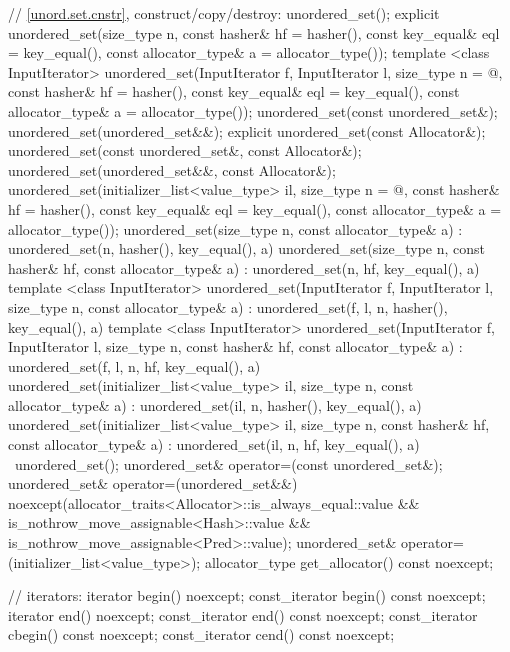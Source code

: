 \begin{codeblock}
{{    // \ref{unord.set.cnstr}, construct/copy/destroy:
    unordered_set();
    explicit unordered_set(size_type n,
                           const hasher& hf = hasher(),
                           const key_equal& eql = key_equal(),
                           const allocator_type& a = allocator_type());
    template <class InputIterator>
      unordered_set(InputIterator f, InputIterator l,
                    size_type n = @\seebelow@,
                    const hasher& hf = hasher(),
                    const key_equal& eql = key_equal(),
                    const allocator_type& a = allocator_type());
    unordered_set(const unordered_set&);
    unordered_set(unordered_set&&);
    explicit unordered_set(const Allocator&);
    unordered_set(const unordered_set&, const Allocator&);
    unordered_set(unordered_set&&, const Allocator&);
    unordered_set(initializer_list<value_type> il,
                  size_type n = @\seebelow@,
                  const hasher& hf = hasher(),
                  const key_equal& eql = key_equal(),
                  const allocator_type& a = allocator_type());
    unordered_set(size_type n, const allocator_type& a)
      : unordered_set(n, hasher(), key_equal(), a) { }
    unordered_set(size_type n, const hasher& hf, const allocator_type& a)
      : unordered_set(n, hf, key_equal(), a) { }
    template <class InputIterator>
      unordered_set(InputIterator f, InputIterator l, size_type n, const allocator_type& a)
        : unordered_set(f, l, n, hasher(), key_equal(), a) { }
    template <class InputIterator>
      unordered_set(InputIterator f, InputIterator l, size_type n, const hasher& hf,
                    const allocator_type& a)
      : unordered_set(f, l, n, hf, key_equal(), a) { }
    unordered_set(initializer_list<value_type> il, size_type n, const allocator_type& a)
      : unordered_set(il, n, hasher(), key_equal(), a) { }
    unordered_set(initializer_list<value_type> il, size_type n, const hasher& hf,
                  const allocator_type& a)
      : unordered_set(il, n, hf, key_equal(), a) { }
    ~unordered_set();
    unordered_set& operator=(const unordered_set&);
    unordered_set& operator=(unordered_set&&)
      noexcept(allocator_traits<Allocator>::is_always_equal::value &&
               is_nothrow_move_assignable<Hash>::value &&
               is_nothrow_move_assignable<Pred>::value);
    unordered_set& operator=(initializer_list<value_type>);
    allocator_type get_allocator() const noexcept;

    // iterators:
    iterator       begin() noexcept;
    const_iterator begin() const noexcept;
    iterator       end() noexcept;
    const_iterator end() const noexcept;
    const_iterator cbegin() const noexcept;
    const_iterator cend() const noexcept;

}}
\end{codeblock}
